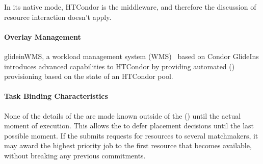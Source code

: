 \documentclass{sig-alternate}
\begin{document}
In its native mode, HTCondor is the middleware, and therefore the discussion of
resource interaction doesn't apply.


\paragraph{Overlay Management}


glideinWMS, a workload management system (WMS)~\cite{1742-6596-119-6-062044}
based on Condor GlideIns introduces advanced \pilotjob capabilities to HTCondor
by providing automated \pilot () provisioning based on the state
of an HTCondor pool.

\paragraph{Task Binding Characteristics}



None of the details of the  are made known outside of the
 () until the actual moment of execution.
This allows the  to defer placement decisions until the last
possible moment.
If the  submits requests for resources to several matchmakers,
it may award the highest priority job to the first resource that becomes
available, without breaking any previous commitments.

\end{document}
